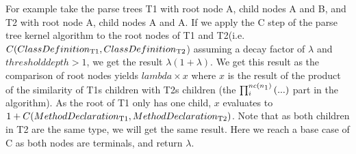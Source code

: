 For example take the parse trees T1 with root node A, child nodes A and B, and T2 with
root node A, child nodes A and A. If we apply the C step of the parse tree kernel algorithm to the root nodes of T1 and T2(i.e. 
$C(ClassDefinition\textsubscript{T1},ClassDefinition\textsubscript{T2}$) assuming a decay factor of $\lambda$ and $threshold depth > 1$, we get the result $\lambda(1 + \lambda)$. 
We get this result as the comparison of root nodes yields 
$lambda \times x$ where $x$ is the result of the product of the similarity of T1s children
with T2s children (the $\prod_{i}^{nc(n\textsubscript{1})}{(...)}$ part in the algorithm). 
As the root of T1 only has one child, $x$ evaluates to
$1 + C(MethodDeclaration\textsubscript{T1}, MethodDeclaration\textsubscript{T2})$. Note that as both
children in T2 are the same type, we will get the same result. Here we reach
a base case of C as both nodes are terminals, and return $\lambda$.

